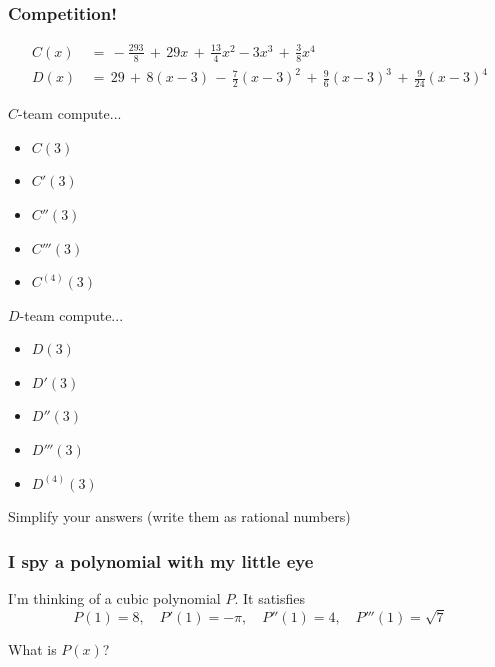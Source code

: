 \documentclass[14pt]{beamer}
\begin{document}
\begin{frame}[t]
	\frametitle{Competition!}
	\vspace{-.8cm}
	{\fontsize{13}{13}\selectfont \begin{align*}C(x)&\, = \, -\frac{293}{8}\, + \, 29x \, + \, \frac{13}{4}x^{2}-3x^{3}\, + \, \frac{3}{8}x^{4}\phantom{\int}\\ D(x)&\, = \, 29 \, + \, 8(x -3) \, - \, \frac{7}{2}(x-3)^{2}\, + \, \frac{9}{6}(x-3)^{3}\, + \, \frac{9}{24}(x-3)^{4}\end{align*} }
	\vspace{-1cm}

	\begin{multicols}{2}
		$C$-team compute...
		\begin{itemize}
			\item $C(3)$

			\item $C'(3)$

			\item $C''(3)$

			\item $C'''(3)$

			\item $C^{(4)}(3)$
		\end{itemize}

		$D$-team compute...
		\begin{itemize}
			\item $D(3)$

			\item $D'(3)$

			\item $D''(3)$

			\item $D'''(3)$

			\item $D^{(4)}(3)$
		\end{itemize}
	\end{multicols}
	Simplify your answers (write them as rational numbers)
\end{frame}

\begin{frame}[t]
	\frametitle{I spy a polynomial with my little eye}

	I'm thinking of a cubic polynomial $P$. It satisfies
	\[
		P(1)=8, \quad P'(1)=-\pi, \quad P''(1) = 4, \quad P'''(1) = \sqrt{7}
	\]

	What is $P(x)$?
\end{frame}
\end{document}
